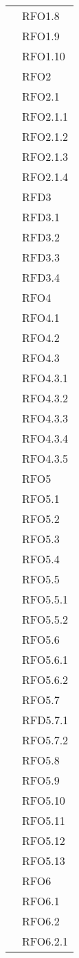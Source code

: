 \begin{longtable}{ p{12cm} | p{4cm} }
			& RFO1.8 \\
			& RFO1.9 \\
			& RFO1.10 \\
			& RFO2 \\
			& RFO2.1 \\
			& RFO2.1.1 \\
			& RFO2.1.2 \\
			& RFO2.1.3 \\
			& RFO2.1.4 \\
			& RFD3 \\
			& RFD3.1 \\
			& RFD3.2 \\
			& RFD3.3 \\
			& RFD3.4 \\
			& RFO4 \\
			& RFO4.1 \\
			& RFO4.2 \\
			& RFO4.3 \\
			& RFO4.3.1 \\
			& RFO4.3.2 \\
			& RFO4.3.3 \\
			& RFO4.3.4 \\
			& RFO4.3.5 \\
			& RFO5 \\
			& RFO5.1 \\
			& RFO5.2 \\
			& RFO5.3 \\
			& RFO5.4 \\
			& RFO5.5 \\
			& RFO5.5.1 \\
			& RFO5.5.2 \\
			& RFO5.6 \\
			& RFO5.6.1 \\
			& RFO5.6.2 \\
			& RFO5.7 \\
			& RFD5.7.1 \\
			& RFO5.7.2 \\
			& RFO5.8 \\
			& RFO5.9 \\
			& RFO5.10 \\
			& RFO5.11 \\
			& RFO5.12 \\
			& RFO5.13 \\
			& RFO6 \\
			& RFO6.1 \\
			& RFO6.2 \\
			& RFO6.2.1 \\

\end{longtable}
